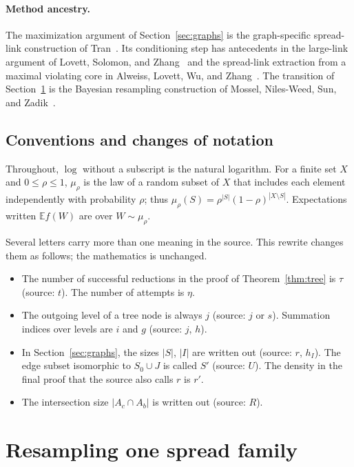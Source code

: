 \documentclass[11pt]{article}
\numberwithin{equation}{section}
\theoremstyle{remark}
\newcommand{\EE}{\mathbb E}
\begin{document}
\paragraph{Method ancestry.}
The maximization argument of Section~\ref{sec:graphs} is the
graph-specific spread-link construction of
Tran~\cite[Section~3]{Tran26}. Its conditioning step has antecedents in
the large-link argument of Lovett, Solomon, and
Zhang~\cite[Claim~29]{LSZ19} and the spread-link extraction from a
maximal violating core in Alweiss, Lovett, Wu, and
Zhang~\cite[Lemma~2.4]{ALWZ21}. The transition of
Section~\ref{sec:resampling} is the Bayesian resampling construction of
Mossel, Niles-Weed, Sun, and Zadik~\cite{MNSZ25}.

\subsection{Conventions and changes of notation}

Throughout, $\log$ without a subscript is the natural logarithm. For a
finite set $X$ and $0\le\rho\le1$, $\mu_\rho$ is the law of a random
subset of $X$ that includes each element independently with probability
$\rho$; thus $\mu_\rho(S)=\rho^{|S|}(1-\rho)^{|X\setminus S|}$.
Expectations written $\EE f(W)$ are over $W\sim\mu_\rho$.

Several letters carry more than one meaning in the source. This rewrite
changes them as follows; the mathematics is unchanged.
\begin{itemize}[leftmargin=2em,itemsep=1pt]
 \item The number of successful reductions in the proof of
 Theorem~\ref{thm:tree} is $\tau$ (source: $t$). The number of attempts
 is $\eta$.
 \item The outgoing level of a tree node is always $j$ (source: $j$ or
 $s$). Summation indices over levels are $i$ and $g$ (source: $j$, $h$).
 \item In Section~\ref{sec:graphs}, the sizes $|S|$, $|I|$ are written
 out (source: $r$, $h_I$). The edge subset isomorphic to $S_0\cup J$ is
 called $S'$ (source: $U$). The density in the final proof that the
 source also calls $r$ is $r'$.
 \item The intersection size $|A_c\cap A_b|$ is written out (source:
 $R$).
\end{itemize}

\section{Resampling one spread family}\label{sec:resampling}
\end{document}
